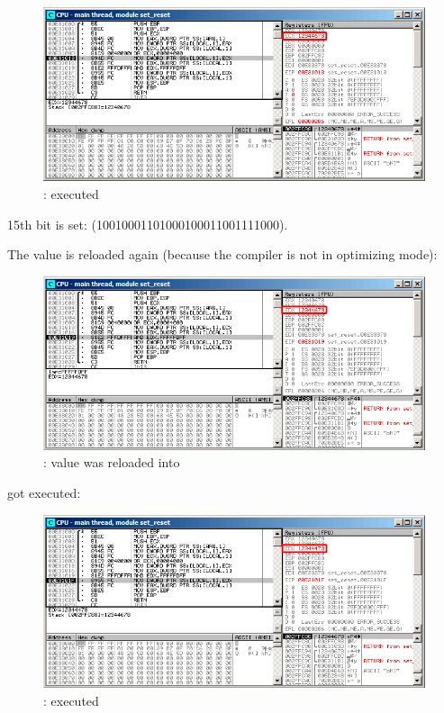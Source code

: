 \begin{figure}[H]
\centering
\includegraphics[scale=\FigScale]{patterns/14_bitfields/2_set_reset/olly2.png}
\caption{\olly: \OR executed}
\label{fig:set_reset_olly2}
\end{figure}

15th bit is set:  
(10010001101000{\color{red}1}00011001111000).

\clearpage
The value is reloaded again (because the compiler is not in optimizing mode): 

\begin{figure}[H]
\centering
\includegraphics[scale=\FigScale]{patterns/14_bitfields/2_set_reset/olly3.png}
\caption{\olly: value was reloaded into \EDX}
\label{fig:set_reset_olly3}
\end{figure}

\clearpage
\AND got executed:

\begin{figure}[H]
\centering
\includegraphics[scale=\FigScale]{patterns/14_bitfields/2_set_reset/olly4.png}
\caption{\olly: \AND executed}
\label{fig:set_reset_olly4}
\end{figure}

